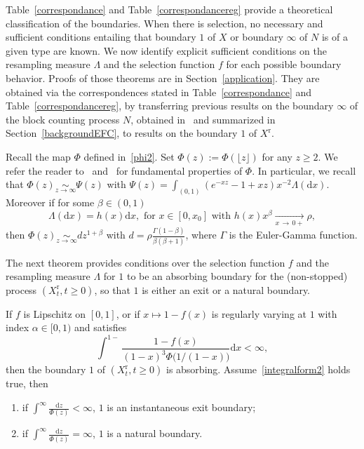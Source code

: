 \documentclass[AHL,Unicode,longabstracts,published]{cedram}
\newcommand{\ddr}{\mathrm{d}}
\newcommand{\rmr}{\mathrm{r}}
\newcommand*{\romanenumi}{\renewcommand*{\theenumi}{\roman{enumi}}}
\begin{document}
Table~\ref{correspondance} and Table~\ref{correspondancereg} provide a theoretical classification of the boundaries. When there is selection, no necessary and sufficient conditions entailing that boundary $1$ of $X$ or boundary $\infty$ of $N$ is of a given type are known. We now identify explicit sufficient conditions on the resampling measure $\Lambda$ and the selection function $f$ for each possible boundary behavior. Proofs of those theorems are in Section~\ref{application}. They are obtained via the correspondences stated in Table~\ref{correspondance} and Table~\ref{correspondancereg}, by transferring previous results on the boundary $\infty$ of the block counting process $N$, obtained in~\cite{explosion} and summarized in Section~\ref{backgroundEFC}, to results on the boundary $1$ of $X^{\rmr}$.

Recall the map $\Phi$ defined in~\eqref{phi2}. Set $\Phi(z):=\Phi(\lfloor z \rfloor)$ for any $z\geq 2$. We refer the reader to~\cite[Section~2.2]{cdiEFC} and~\cite{limic2015} for fundamental properties of $\Phi$. In particular, we recall that $\Phi(z)\underset{z\rightarrow \infty}{\sim} \Psi(z)$ with $\Psi(z)=\int_{(0,1)}(e^{-xz}-1+xz)x^{-2}\Lambda(\ddr x)$. Moreover if for some $\beta \in (0,1)$
\begin{equation}\label{regularlambda}
\Lambda(\ddr x)=h(x)\ddr x,\text{ for } x\in [0,x_0] \text{ with } h(x)x^{\beta}\underset{x\,\rightarrow\, 0+}{\longrightarrow}\rho,
\end{equation}
then $\Phi(z)\underset{z\rightarrow \infty}{\sim} dz^{1+\beta}$ with $d=\rho\frac{\Gamma(1-\beta)}{\beta(\beta+1)}$, where $\Gamma$ is the Euler-Gamma function.

The next theorem provides conditions over the selection function $f$ and the resampling measure $\Lambda$ for $1$ to be an absorbing boundary for the (non-stopped) process $(X_t^{\rmr},t\geq 0)$, so that $1$ is either an exit or a natural boundary.

\begin{theo}\label{suffcondexitf}
If $f$ is Lipschitz on $[0,1]$, or if $x\mapsto 1-f(x)$ is regularly varying at $1$ with index $\alpha\in [0,1)$ and satisfies
\begin{equation}\label{integralform2}
\int^{1-}\frac{1-f(x)}{(1-x)^3\Phi\big(1/(1-x)\big)} \ddr x<\infty,
\end{equation}
then the boundary $1$ of $(X^{\rmr}_t,t\geq 0)$ is absorbing. Assume~\eqref{integralform2} holds true, then
\begin{enumerate}\romanenumi
\item\label{theo 2.11.i} if $\int^{\infty}\frac{\ddr z}{\Phi(z)}<\infty$, $1$ is an instantaneous exit boundary;
\item\label{theo 2.11.ii} if $\int^{\infty}\frac{\ddr z}{\Phi(z)}=\infty$, $1$ is a natural boundary.
\end{enumerate}
\end{theo}
\end{document}
